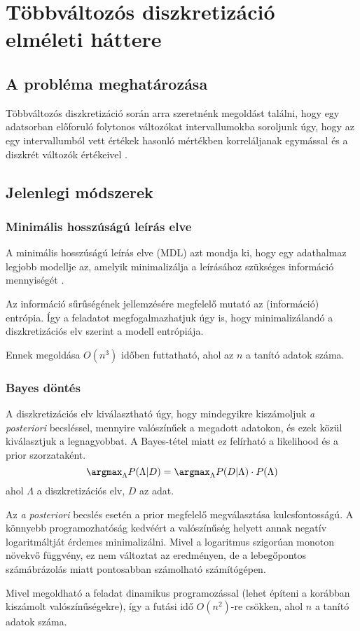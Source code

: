 \chapter{Többváltozós diszkretizáció elméleti háttere}

\section{A probléma meghatározása}
Többváltozós diszkretizáció során arra szeretnénk megoldást találni, hogy egy adatsorban előforuló folytonos változókat intervallumokba soroljunk úgy, hogy az egy intervallumból vett értékek hasonló mértékben korreláljanak egymással és a diszkrét változók értékeivel \cite{monti2013multivariate}.

\section{Jelenlegi módszerek}
\subsection{Minimális hosszúságú leírás elve}
A minimális hosszúságú leírás elve (MDL) azt mondja ki, hogy egy adathalmaz legjobb modellje az, amelyik minimalizálja a leírásához szükséges információ mennyiségét \cite{friedman1996discretizing}.

Az információ sűrűségének jellemzésére megfelelő mutató az (információ) entrópia. Így a feladatot megfogalmazhatjuk úgy is, hogy minimalizálandó a diszkretizációs elv szerint a modell entrópiája.

Ennek megoldása $O(n^3)$ időben futtatható, ahol az $n$ a tanító adatok száma.

\subsection{Bayes döntés}
A diszkretizációs elv kiválasztható úgy, hogy mindegyikre kiszámoljuk \textit{a posteriori} becsléssel, mennyire valószínűek a megadott adatokon, és ezek közül kiválasztjuk a legnagyobbat. A Bayes-tétel miatt ez felírható a likelihood és a prior szorzataként.
$$ \argmax_{\Lambda}{P(\Lambda | D)} =
\argmax_{\Lambda}{P(D | \Lambda) \cdot P(\Lambda)} $$
ahol $\Lambda$ a diszkretizációs elv, $D$ az adat.

Az \textit{a posteriori} becslés esetén a prior megfelelő megválasztása kulcsfontosságú. A könnyebb programozhatóság kedvéért a valószínűség helyett annak negatív logaritmáltját érdemes minimalizálni. Mivel a logaritmus szigorúan monoton növekvő függvény, ez nem változtat az eredményen, de a lebegőpontos számábrázolás miatt pontosabban számolható számítógépen.

Mivel megoldható a feladat dinamikus programozással (lehet építeni a korábban kiszámolt valószínűségekre), így a futási idő $O(n^2)$-re csökken, ahol $n$ a tanító adatok száma.

